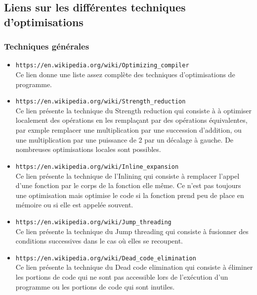 \documentclass[a4paper]{article}
\begin{document}
\subsection{Liens sur les différentes techniques d'optimisations}
\subsubsection{Techniques générales}
\begin{itemize}
\item \texttt{https://en.wikipedia.org/wiki/Optimizing\_compiler} \\
Ce lien donne une liste assez complète des techniques d'optimisations de programme.\\

\item \texttt{https://en.wikipedia.org/wiki/Strength\_reduction} \\
Ce lien présente la technique du Strength reduction qui consiste à à optimiser localement des opérations en les remplaçant par des opérations équivalentes, par exmple remplacer une multiplication par une succession d'addition, ou une multiplication par une puissance de 2 par un décalage à gauche. De nombreuses optimisations locales sont possibles.\\

\item \texttt{https://en.wikipedia.org/wiki/Inline\_expansion} \\
Ce lien présente la technique de l'Inlining qui consiste à remplacer l'appel d'une fonction par le corps de la fonction elle même. Ce n'est pas toujours une optimisation mais optimise le code si la fonction prend peu de place en mémoire ou si elle est appelée souvent.\\

\item \texttt{https://en.wikipedia.org/wiki/Jump\_threading} \\
Ce lien présente la technique du Jump threading qui consiste à fusionner des conditions successives dans le cas où elles se recoupent.\\

\item \texttt{https://en.wikipedia.org/wiki/Dead\_code\_elimination} \\
Ce lien présente la technique du Dead code elimination qui consiste à éliminer les portions de code qui ne sont pas accessible lors de l'exécution d'un programme ou les portions de code qui sont inutiles.\\


\end{itemize}
\end{document}
